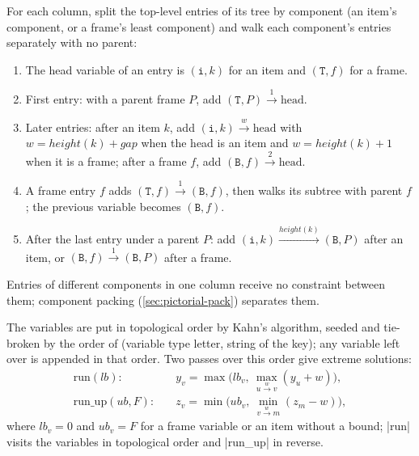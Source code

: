 \begin{algorithm}\label{alg:pictorial-constraints}
For each column, split the top-level entries of its tree by component (an item's component, or a
frame's least component) and walk each component's entries separately with no parent:
\begin{enumerate}
  \item The head variable of an entry is $(\mathtt{i},k)$ for an item and $(\mathtt{T},f)$ for a
    frame.
  \item First entry: with a parent frame $P$, add $(\mathtt{T},P)\xrightarrow{1}\text{head}$.
  \item Later entries: after an item $k$, add $(\mathtt{i},k)\xrightarrow{w}\text{head}$ with
    $w = \mathit{height}(k)+\mathit{gap}$ when the head is an item and
    $w = \mathit{height}(k)+1$ when it is a frame; after a frame $f$, add
    $(\mathtt{B},f)\xrightarrow{2}\text{head}$.
  \item A frame entry $f$ adds $(\mathtt{T},f)\xrightarrow{1}(\mathtt{B},f)$, then walks its
    subtree with parent $f$; the previous variable becomes $(\mathtt{B},f)$.
  \item After the last entry under a parent $P$: add
    $(\mathtt{i},k)\xrightarrow{\mathit{height}(k)}(\mathtt{B},P)$ after an item, or
    $(\mathtt{B},f)\xrightarrow{1}(\mathtt{B},P)$ after a frame.
\end{enumerate}
Entries of different components in one column receive no constraint between them; component
packing (\cref{sec:pictorial-pack}) separates them.
\end{algorithm}

The variables are put in topological order by Kahn's algorithm, seeded and tie-broken by the
order of (variable type letter, string of the key); any variable left over is appended in that
order. Two passes over this order give extreme solutions:
\begin{align*}
  \mathrm{run}(\mathit{lb}):\quad & y_v = \max\bigl(\mathit{lb}_v,\ \max_{u\xrightarrow{w}v}(y_u+w)\bigr),\\
  \mathrm{run\_up}(\mathit{ub}, F):\quad & z_v = \min\bigl(\mathit{ub}_v,\ \min_{v\xrightarrow{w}m}(z_m-w)\bigr),
\end{align*}
where $\mathit{lb}_v = 0$ and $\mathit{ub}_v = F$ for a frame variable or an item without a
bound; \py|run| visits the variables in topological order and \py|run_up| in reverse.

